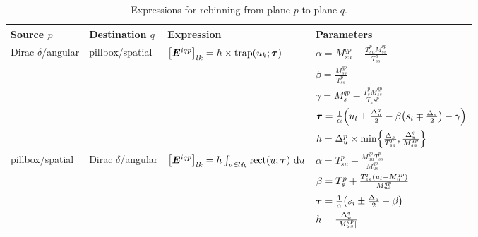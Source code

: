 \begin{table}
    \centering
    \begin{tabular}{llll}
        \toprule
        {\bf Source $p$} & {\bf Destination $q$} & {\bf Expression} & {\bf Parameters} \\
        \midrule
        Dirac $\delta$/angular 
        &
        pillbox/spatial
        &
        $
         {\left[ {\bm{E}}^{iqp} \right] }_{lk}
        =
        h \times \text{trap} {\left( u_k; {\ensuremath{\bm{\tau}}}\right)}
        $
        &
        $\alpha = M^{qp}_{su} - \frac{T_{su}^p M^{qp}_{ss}}{T^p_{ss}}$
        \\ & & &
        $\beta = \frac{M^{qp}_{ss}}{T_{ss}^p}$
        \\ & & &
        $\gamma = M^{qp}_s - \frac{T_s^pM^{qp}_{ss}}{T_ss^p}$
        \\ & & &
        ${\bm{\tau}} = \frac{1}{\alpha} {\left( u_l \pm \frac{\Delta_u^q}{2} 
                - \beta {\left( s_i \mp \frac{\Delta_s}{2} \right)} - \gamma \right)}$
        \\ & & &
        $h = \Delta^p_u \times \text{min} {\left\{ \frac{\Delta_s}{T_{ss}^p}, \frac{\Delta^q_u}{M^{qp}_{ss}} \right\} }$
        \\
        \midrule
        pillbox/spatial
        &
        Dirac $\delta$/angular
        &
        $ {\left[ {\bm{E}}^{iqp} \right] }_{lk} = h \int_{u \in \mathcal{U}_k} \text{rect} {\left( u; {\ensuremath{\bm{\tau}}}\right)} ~\text{d}{u}$
        &
        $\alpha = T_{su}^p - \frac{M_{uu}^{qp}T_{ss}^p}{M^{qp}_{us}}$
        \\ & & &
        $\beta = T_s^p + \frac{T_{ss}^p {\left( u_l - M^{qp}_u \right)}}{M^{qp}_{us}}$
        \\ & & &
        ${\bm{\tau}} = \frac{1}{\alpha} {\left( s_i \pm \frac{\Delta_s}{2} - \beta \right)}$
        \\ & & &
        $h = \frac{\Delta^q_u}{ {\left| M^{qp}_{us} \right| }}$
        \\
        \bottomrule
    \end{tabular}
    \caption{Expressions for rebinning from plane $p$ to plane $q$.}
    \label{tab,rebin}
\end{table}
